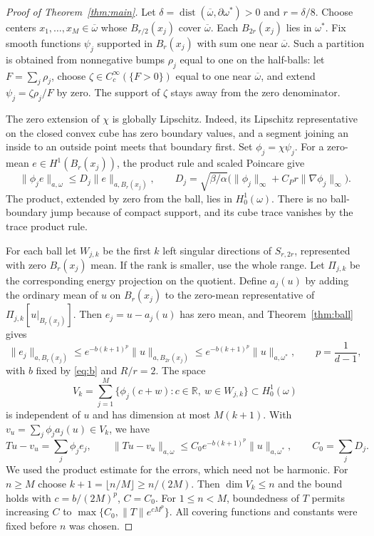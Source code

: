 \documentclass[11pt]{article}
\theoremstyle{remark}
\newcommand{\R}{\mathbb R}
\newcommand{\norma}[2]{\|#1\|_{a,#2}}
\DeclareMathOperator{\dist}{dist}
\begin{document}
\begin{proof}[Proof of Theorem~\ref{thm:main}]
Let $\delta=\dist(\overline\omega,\partial\omega^*)>0$ and $r=\delta/8$.
Choose centers $x_1,\ldots,x_M\in\overline\omega$ whose $B_{r/2}(x_j)$
cover $\overline\omega$. Each $B_{2r}(x_j)$ lies in $\omega^*$.
Fix smooth functions $\psi_j$ supported in $B_r(x_j)$ with sum one
near $\overline\omega$. Such a partition is obtained from nonnegative
bumps $\rho_j$ equal to one on the half-balls: let $F=\sum_j\rho_j$,
choose $\zeta\in C_c^\infty(\{F>0\})$ equal to one near
$\overline\omega$, and extend $\psi_j=\zeta\rho_j/F$ by zero.
The support of $\zeta$ stays away from the zero denominator.

The zero extension of $\chi$ is globally Lipschitz. Indeed, its
Lipschitz representative on the closed convex cube has zero boundary
values, and a segment joining an inside to an outside point meets
that boundary first. Set $\phi_j=\chi\psi_j$. For a zero-mean
$e\in H^1(B_r(x_j))$, the product rule and scaled Poincare give
\begin{equation}\label{eq:patchmultiplier}
 \norma{\phi_j e}{\omega}\le D_j\norma{e}{B_r(x_j)},\qquad
 D_j=\sqrt{\beta/\alpha}
       \bigl(\|\phi_j\|_\infty+C_Pr\|\nabla\phi_j\|_\infty\bigr).
\end{equation}
The product, extended by zero from the ball, lies in $H^1_0(\omega)$.
There is no ball-boundary jump because of compact support, and its
cube trace vanishes by the trace product rule.

For each ball let $W_{j,k}$ be the first $k$ left singular directions
of $S_{r,2r}$, represented with zero $B_r(x_j)$ mean. If the rank is
smaller, use the whole range. Let $\Pi_{j,k}$ be the corresponding
energy projection on the quotient. Define $a_j(u)$ by adding the
ordinary mean of $u$ on $B_r(x_j)$ to the zero-mean representative
of $\Pi_{j,k}[u|_{B_r(x_j)}]$. Then $e_j=u-a_j(u)$ has zero mean,
and Theorem~\ref{thm:ball} gives
\[
 \norma{e_j}{B_r(x_j)}\le e^{-b(k+1)^p}\norma{u}{B_{2r}(x_j)}
       \le e^{-b(k+1)^p}\norma{u}{\omega^*},\qquad p=\frac1{d-1},
\]
with $b$ fixed by \eqref{eq:b} and $R/r=2$.
The space
\[
 V_k=\sum_{j=1}^M\{\phi_j(c+w):c\in\R,\ w\in W_{j,k}\}
       \subset H^1_0(\omega)
\]
is independent of $u$ and has dimension at most $M(k+1)$.
With $v_u=\sum_j\phi_j a_j(u)\in V_k$, we have
\[
 Tu-v_u=\sum_j\phi_j e_j,\qquad
 \norma{Tu-v_u}{\omega}\le C_0e^{-b(k+1)^p}\norma{u}{\omega^*},
 \qquad C_0=\sum_jD_j.
\]
We used the product estimate for the errors, which need not be harmonic.
For $n\ge M$ choose $k+1=\lfloor n/M\rfloor\ge n/(2M)$.
Then $\dim V_k\le n$ and the bound holds with $c=b/(2M)^p$, $C=C_0$.
For $1\le n<M$, boundedness of $T$ permits increasing $C$ to
$\max\{C_0,\|T\|e^{cM^p}\}$. All covering functions and constants
were fixed before $n$ was chosen.
\end{proof}
\end{document}
